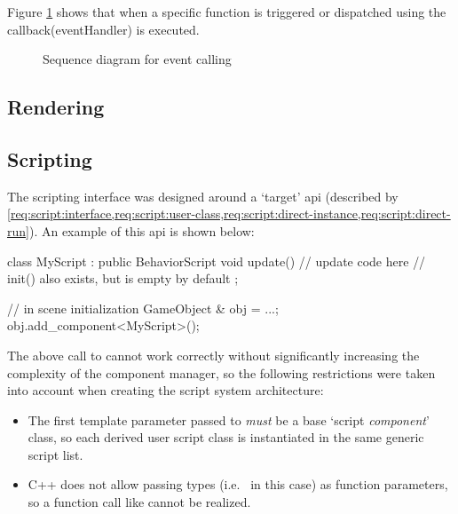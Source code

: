 \documentclass{projdoc}
\begin{document}
Figure \ref{fig:event-seq} shows that when a specific function is triggered or dispatched using the callback(eventHandler) is executed.
\begin{figure}
	\centering
	\caption{Sequence diagram for event calling}
	\label{fig:event-seq}
\end{figure}
\subsection{Rendering}
\subsection{Scripting}

The scripting interface was designed around a `target' \gls{api} (described by
\cref{req:script:interface,req:script:user-class,req:script:direct-instance,req:script:direct-run}).
An example of this \gls{api} is shown below:\noparbreak

\begin{blockcode}
class MyScript : public BehaviorScript {
	void update() {
		// update code here
	}
	// init() also exists, but is empty by default
};

{ // in scene initialization
	GameObject & obj = ...;
	obj.add_component<MyScript>();
}
\end{blockcode}

The above call to  cannot work correctly
without significantly increasing the complexity of the component manager, so the
following restrictions were taken into account when creating the script system
architecture:\noparbreak

\begin{itemize}
	\item The first template parameter passed to 
		\emph{must} be a base `script \emph{component}' class, so each derived user
		script class is instantiated in the same generic script list.
	\item C++ does not allow passing types (i.e.~ in this case) as
		function parameters, so a function call like
		 cannot be realized.
\end{itemize}
\end{document}
